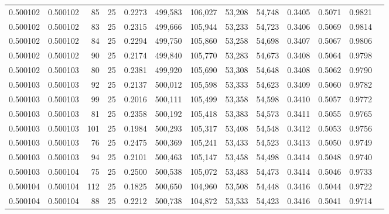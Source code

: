 \begin{tabular}{rrrrrrrrrrrrr}
0.500102 & 0.500102 &    85 &  25 &                                     0.2273 & 499,583 & 106,027 &  53,208 &  54,748 & 0.3405 & 0.5071 & 0.9821 \\
0.500102 & 0.500102 &    83 &  25 &                                     0.2315 & 499,666 & 105,944 &  53,233 &  54,723 & 0.3406 & 0.5069 & 0.9814 \\
0.500102 & 0.500102 &    84 &  25 &                                     0.2294 & 499,750 & 105,860 &  53,258 &  54,698 & 0.3407 & 0.5067 & 0.9806 \\
0.500102 & 0.500102 &    90 &  25 &                                     0.2174 & 499,840 & 105,770 &  53,283 &  54,673 & 0.3408 & 0.5064 & 0.9798 \\
0.500102 & 0.500103 &    80 &  25 &                                     0.2381 & 499,920 & 105,690 &  53,308 &  54,648 & 0.3408 & 0.5062 & 0.9790 \\
0.500103 & 0.500103 &    92 &  25 &                                     0.2137 & 500,012 & 105,598 &  53,333 &  54,623 & 0.3409 & 0.5060 & 0.9782 \\
0.500103 & 0.500103 &    99 &  25 &                                     0.2016 & 500,111 & 105,499 &  53,358 &  54,598 & 0.3410 & 0.5057 & 0.9772 \\
0.500103 & 0.500103 &    81 &  25 &                                     0.2358 & 500,192 & 105,418 &  53,383 &  54,573 & 0.3411 & 0.5055 & 0.9765 \\
0.500103 & 0.500103 &   101 &  25 &                                     0.1984 & 500,293 & 105,317 &  53,408 &  54,548 & 0.3412 & 0.5053 & 0.9756 \\
0.500103 & 0.500103 &    76 &  25 &                                     0.2475 & 500,369 & 105,241 &  53,433 &  54,523 & 0.3413 & 0.5050 & 0.9749 \\
0.500103 & 0.500103 &    94 &  25 &                                     0.2101 & 500,463 & 105,147 &  53,458 &  54,498 & 0.3414 & 0.5048 & 0.9740 \\
0.500103 & 0.500104 &    75 &  25 &                                     0.2500 & 500,538 & 105,072 &  53,483 &  54,473 & 0.3414 & 0.5046 & 0.9733 \\
0.500104 & 0.500104 &   112 &  25 &                                     0.1825 & 500,650 & 104,960 &  53,508 &  54,448 & 0.3416 & 0.5044 & 0.9722 \\
0.500104 & 0.500104 &    88 &  25 &                                     0.2212 & 500,738 & 104,872 &  53,533 &  54,423 & 0.3416 & 0.5041 & 0.9714 \\

\end{tabular}
